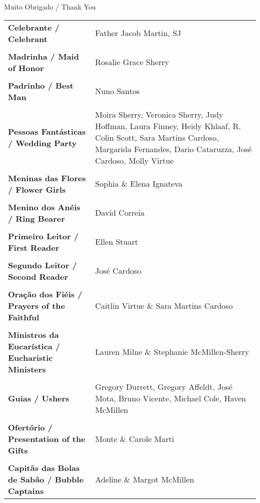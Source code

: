 \centering
{\Large Muito Obrigado / Thank You}

\begin{longtable}{p{1.7in}p{1.7in}}
{\bf Celebrante / Celebrant} & Father Jacob Martin, SJ\\
\\

{\bf Madrinha / Maid of Honor} & Rosalie Grace Sherry\\
\\

{\bf Padrinho / Best Man} & Nuno Santos\\
\\

{\bf Pessoas Fantásticas / Wedding Party} & Moira Sherry, Veronica Sherry, Judy Hoffman, Laura Finney, Heidy Khlaaf, R. Colin Scott, Sara Martins Cardoso, Margarida Fernandes, Dario Cataruzza, José Cardoso, Molly Virtue\\
\\

{\bf Meninas das Flores / Flower Girls} & Sophia \& Elena Ignateva\\
\\

{\bf Menino dos Anéis / Ring Bearer} & David Correia\\
\\

{\bf Primeiro Leitor / First Reader} & Ellen Stuart\\
\\

{\bf  Segundo Leitor / Second Reader} & José Cardoso \\
\\

{\bf Oração dos Fiéis / Prayers of the Faithful} & Caitlin Virtue \& Sara Martins Cardoso\\
\\

{\bf Ministros da Eucarística / Eucharistic Ministers} & Lauren Milne \& Stephanie McMillen-Sherry\\
\\

{\bf Guias / Ushers} & Gregory Durrett, Gregory Affeldt, José Mota, Bruno Vicente, Michael Cole, Haven McMillen\\
\\

{\bf Ofertório / Presentation of the Gifts} & Monte \& Carole Marti\\
\\

{\bf Capitãs das Bolas de Sabão / Bubble Captains} & Adeline \& Margot McMillen\\

\end{longtable}
